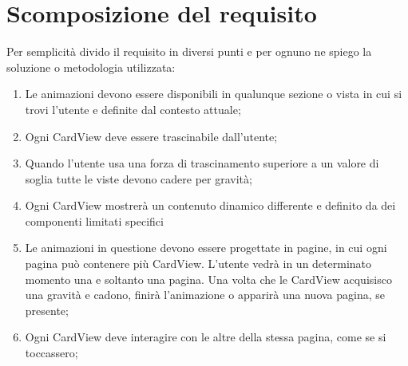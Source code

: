 

\section{Scomposizione del requisito}

Per semplicità divido il requisito in diversi punti e per ognuno ne spiego la soluzione
o metodologia utilizzata:

\begin{enumerate}
    \item\label{animationenum:1} Le animazioni devono essere disponibili in qualunque sezione o vista in cui si trovi l'utente e definite dal contesto attuale;

    \item\label{animationenum:2} Ogni CardView deve essere trascinabile dall'utente;
    
    \item\label{animationenum:3} Quando l'utente usa una forza di trascinamento superiore a un valore di soglia tutte le viste devono
        cadere per gravità;

    \item\label{animationenum:4} Ogni CardView mostrerà un contenuto dinamico differente e definito da dei componenti
    limitati specifici

    \item\label{animationenum:5} Le animazioni in questione devono essere progettate in pagine, in cui ogni pagina può contenere 
    più CardView. L'utente vedrà in un determinato momento una e soltanto una pagina. 
    Una volta che le CardView acquisisco una gravità e cadono, finirà l'animazione o apparirà
    una nuova pagina, se presente;

    \item\label{animationenum:7} Ogni CardView deve interagire con le altre della stessa pagina, come se si toccassero;

\end{enumerate}

